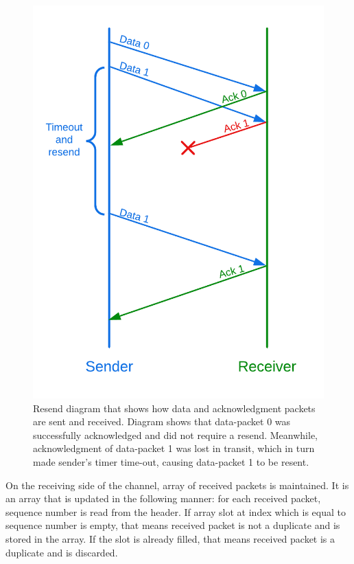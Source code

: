 \documentclass[times, utf8, diplomski]{fer}
\begin{document}
\begin{figure}[H]
	\centering
	\includegraphics[scale=0.3]{Resend-diagram}
	\caption{Resend diagram that shows how data and acknowledgment packets are sent and received. Diagram shows that data-packet 0 was successfully acknowledged and did not require a resend. Meanwhile, acknowledgment of data-packet 1 was lost in transit, which in turn made sender's timer time-out, causing data-packet 1 to be resent.}
	\label{fig:resend-diagram}
\end{figure}

On the receiving side of the channel, array of received packets is maintained. It is an array that is updated in the following manner: for each received packet, sequence number is read from the header. If array slot at index which is equal to sequence number is empty, that means received packet is not a duplicate and is stored in the array. If the slot is already filled, that means received packet is a duplicate and is discarded. \\
\end{document}
